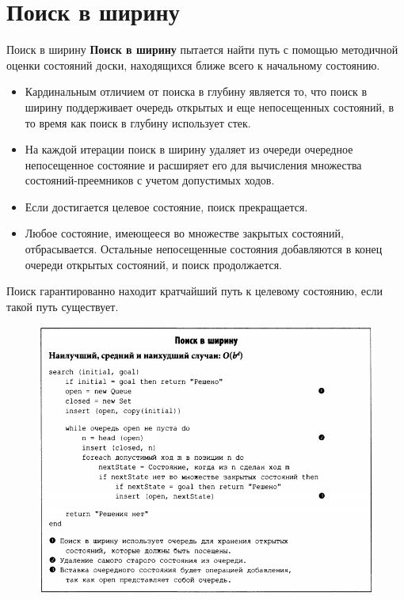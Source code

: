 \documentclass{beamer}
\begin{document}
\section{Поиск в ширину}

\begin{frame}{Поиск в ширину}
\textbf{Поиск в ширину} пытается найти путь с помощью методичной оценки состояний доски, находящихся ближе всего к начальному состоянию.
\begin{itemize}
\item Кардинальным отличием от поиска в глубину является то, что поиск в ширину поддерживает очередь открытых и еще непосещенных состояний, в то время как поиск в глубину использует стек. 
\item На каждой итерации поиск в ширину удаляет из очереди очередное непосещенное состояние и расширяет его для вычисления множества состояний-преемников с учетом допустимых ходов. 
\item Если достигается целевое состояние, поиск прекращается. 
\item Любое состояние, имеющееся во множестве закрытых состояний, отбрасывается. Остальные непосещенные состояния добавляются в конец очереди открытых состояний, и поиск продолжается.
\end{itemize}
Поиск гарантированно находит кратчайший путь к целевому состоянию, если такой путь существует.
\end{frame}

\begin{frame}
\begin{figure}[h]
\centering
\includegraphics[scale=0.5]{images/lec06-pic07.png}
\end{figure}
\end{frame}
\end{document}
